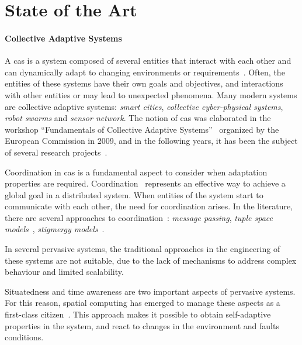 \documentclass[12pt]{article}
\begin{document}
\section{State of the Art}\label{sec:state-of-the-art}

\paragraph{Collective Adaptive Systems}
A \ac{cas} is a system composed of several entities that interact with each other and can dynamically adapt to changing environments or requirements~\cite{DBLP:conf/birthday/HolzlW11}.
%
Often,
the entities of these systems have their own goals and objectives,
and interactions with other entities or may lead to unexpected phenomena.
%
Many modern systems are collective adaptive systems: \emph{smart cities}, \emph{collective cyber-physical systems}, \emph{robot swarms} and \emph{sensor network}.
%
The notion of \ac{cas} was elaborated in the workshop ``Fundamentals of Collective Adaptive Systems''~\cite{DBLP:journals/corr/abs-1108-5643}
organized by the European Commission in 2009,
and in the following years,
it has been the subject of several research projects~\cite{DBLP:journals/procedia/ZambonelliCFMRSRTDSYNOMVFMW11,DBLP:series/lncs/8998}.

Coordination in \ac{cas} is a fundamental aspect to consider when adaptation properties are required.
%
Coordination~\cite{DBLP:journals/csur/Ciancarini96} represents an effective way to achieve a global goal in a distributed system.
%
When entities of the system start to communicate with each other,
the need for coordination arises.
%
In the literature,
there are several approaches to coordination~\cite{DBLP:journals/csur/Ciancarini96}:
\emph{message passing}, \emph{tuple space models}~\cite{DBLP:books/sp/omicini01/RossiCD01}, \emph{stigmergy models}~\cite{DBLP:journals/cogsr/Heylighen16}.

In several pervasive systems,
the traditional approaches in the engineering of these systems are not suitable,
due to the lack of mechanisms to address complex behaviour and limited scalability.

Situatedness and time awareness are two important aspects of pervasive systems.
%
For this reason,
spatial computing has emerged to manage these aspects as a first-class citizen~\cite{Beal_Viroli_2015}.
%
This approach makes it possible to obtain self-adaptive properties in the system,
and react to changes in the environment and faults conditions.
\end{document}
